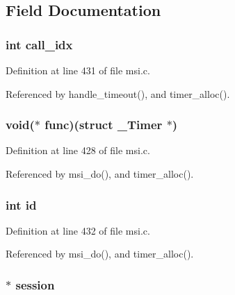 \subsection{Field Documentation}
\hypertarget{struct___timer_a1137c8c8a662d51868eda69bd73915d0}{
\subsubsection[{call\+\_\+idx}]{\setlength{\rightskip}{0pt plus 5cm}int call\+\_\+idx}}\label{struct___timer_a1137c8c8a662d51868eda69bd73915d0}


Definition at line 431 of file msi.\+c.



Referenced by handle\+\_\+timeout(), and timer\+\_\+alloc().

\hypertarget{struct___timer_a7b75ecf42c49a289b6dd4fefdbf86605}{
\subsubsection[{func}]{\setlength{\rightskip}{0pt plus 5cm}void($\ast$ func)(struct {\bf \+\_\+\+Timer} $\ast$)}}\label{struct___timer_a7b75ecf42c49a289b6dd4fefdbf86605}


Definition at line 428 of file msi.\+c.



Referenced by msi\+\_\+do(), and timer\+\_\+alloc().

\hypertarget{struct___timer_a7441ef0865bcb3db9b8064dd7375c1ea}{
\subsubsection[{id}]{\setlength{\rightskip}{0pt plus 5cm}int id}}\label{struct___timer_a7441ef0865bcb3db9b8064dd7375c1ea}


Definition at line 432 of file msi.\+c.



Referenced by msi\+\_\+do(), and timer\+\_\+alloc().

\hypertarget{struct___timer_affcb6f96b80aecebae0f1b157c6242b5}{
\subsubsection[{session}]{$\ast$ session}}\label{struct___timer_affcb6f96b80aecebae0f1b157c6242b5}


